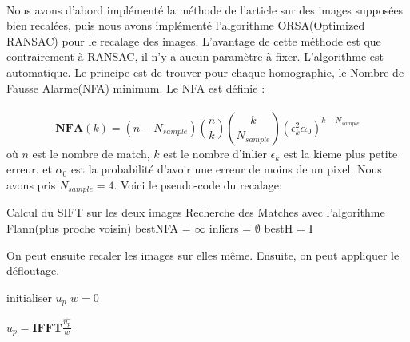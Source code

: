 \documentclass[a4paper,10pt]{report}
\begin{document}
\paragraph{}
Nous avons d'abord implémenté la méthode de l'article sur des images supposées bien recalées, puis
nous avons implémenté l'algorithme ORSA(Optimized RANSAC) pour le recalage des images.
L'avantage de cette méthode est que contrairement à RANSAC, il n'y a aucun
paramètre à fixer. L'algorithme est automatique. Le principe est de trouver 
pour chaque homographie, le Nombre de Fausse Alarme(NFA) minimum. Le 
NFA est définie  :
\\\\
$$
\mathbf{NFA}(k) = (n-N_{sample})\binom{n}{k}\binom{k}{N_{sample}}(\epsilon_k^2 \alpha_0)^{k-N_{sample}}
$$
où $n$ est le nombre de match, $k$ est le nombre d'inlier $\epsilon_k$ est la kieme plus petite erreur. et $\alpha_0$ est la probabilité
d'avoir une erreur de moins de un pixel. Nous avons pris $N_{sample}=4$.
Voici le pseudo-code du recalage:\\
\begin{algorithm}[H]
   Calcul du SIFT sur les deux images\;
   Recherche des Matches avec l'algorithme Flann(plus proche voisin)\;
   bestNFA = $\infty$\;
   inliers = $\emptyset$\;
   bestH = I\;
\end{algorithm}

On peut ensuite recaler les images sur elles même. Ensuite, on peut appliquer le défloutage.
\begin{algorithm}
  initialiser $u_p$ \;
  $w=0$\;
  
  $u_p = \mathbf{IFFT}{\frac{\hat{u_p}}{w}}$\;
  
\end{algorithm}
\end{document}
